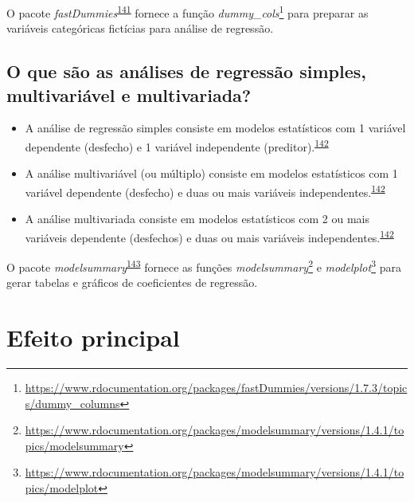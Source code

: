 \documentclass[
  a4paper,
]{book}
\renewcommand{\href}[2]{#2\footnote{\url{#1}}}
\newenvironment{infobox}[1]
  {
  \begin{itemize}
  \renewcommand{\labelitemi}{
    \raisebox{-.7\height}[0pt][0pt]{
      {\setkeys{Gin}{width=3em,keepaspectratio}
        \texttt{[image: \#1]}}
    }
  }
  \setlength{\fboxsep}{1em}
  \begin{blackbox}
  \item
  }
  {
  \end{blackbox}
  \end{itemize}
  }
\begin{document}
\begin{infobox}{images/Rlogo}
O pacote \emph{fastDummies}\textsuperscript{\protect\hyperlink{ref-fastDummies}{141}} fornece a função \href{https://www.rdocumentation.org/packages/fastDummies/versions/1.7.3/topics/dummy_columns}{\emph{dummy\_cols}} para preparar as variáveis categóricas fictícias para análise de regressão.

\end{infobox}

\hypertarget{o-que-suxe3o-as-anuxe1lises-de-regressuxe3o-simples-multivariuxe1vel-e-multivariada}{%
\subsection{O que são as análises de regressão simples, multivariável e multivariada?}\label{o-que-suxe3o-as-anuxe1lises-de-regressuxe3o-simples-multivariuxe1vel-e-multivariada}}

\begin{itemize}
\item
  A análise de regressão simples consiste em modelos estatísticos com 1 variável dependente (desfecho) e 1 variável independente (preditor).\textsuperscript{\protect\hyperlink{ref-Hidalgo2013}{142}}
\item
  A análise multivariável (ou múltiplo) consiste em modelos estatísticos com 1 variável dependente (desfecho) e duas ou mais variáveis independentes.\textsuperscript{\protect\hyperlink{ref-Hidalgo2013}{142}}
\item
  A análise multivariada consiste em modelos estatísticos com 2 ou mais variáveis dependente (desfechos) e duas ou mais variáveis independentes.\textsuperscript{\protect\hyperlink{ref-Hidalgo2013}{142}}
\end{itemize}

\begin{infobox}{images/Rlogo}
O pacote \emph{modelsummary}\textsuperscript{\protect\hyperlink{ref-modelsummary}{143}} fornece as funções \href{https://www.rdocumentation.org/packages/modelsummary/versions/1.4.1/topics/modelsummary}{\emph{modelsummary}} e \href{https://www.rdocumentation.org/packages/modelsummary/versions/1.4.1/topics/modelplot}{\emph{modelplot}} para gerar tabelas e gráficos de coeficientes de regressão.

\end{infobox}

\hypertarget{efeito-principal}{%
\section{Efeito principal}\label{efeito-principal}}
\end{document}
